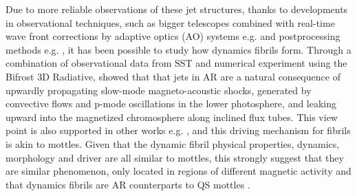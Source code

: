 \documentclass[12pt]{ociamthesis}
\begin{document}
\par Due to more reliable observations of these jet structures, thanks to developments in observational techniques, such as bigger telescopes combined with real-time wave front corrections by adaptive optics (AO) systems e.g. \citep{Scharmer2003SPIE4853370S,Rimmele2000SPIE4007218R} and postprocessing methods e.g. \citep{van2005SoPh228191V,von1993AA268374V}, it has been possible to study how dynamics fibrils form. Through a combination of observational data from SST and numerical experiment using the Bifrost 3D Radiative, \cite{Hansteen2006ApJ} showed that that jets in AR are a natural consequence of upwardly propagating slow-mode magneto-acoustic shocks, generated by convective flows and p-mode oscillations in the lower photosphere, and leaking upward into the magnetized chromosphere along inclined flux tubes. This view point is also supported in other works e.g. \citep{Heggland2007ApJ6661277H,De_Pontieu2007ApJ,Pontieu2004Natur,Suematsu1990LNP367211S}, and this driving mechanism for fibrils is akin to mottles. Given that the dynamic fibril physical properties, dynamics, morphology and driver are all similar to mottles, this strongly suggest that they are similar phenomenon, only located in regions of different magnetic activity and that dynamics fibrils are AR counterparts to QS mottles \citep{Rouppe2007ApJ660L169R}.
\end{document}
